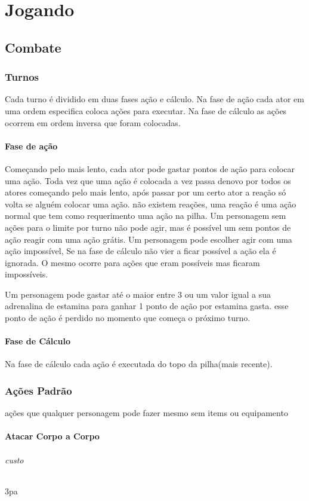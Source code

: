 \part{Jogando}
\chapter{Combate}
\section{Turnos}
%
%
Cada turno é dividido em duas fases ação e cálculo.
Na fase de ação cada ator em uma ordem especifica coloca ações para executar.
Na fase de cálculo as ações ocorrem em ordem inversa que foram colocadas.
%
\subsection{Fase de ação}
Começando pelo mais lento, cada ator pode gastar pontos de ação para colocar uma ação.
Toda vez que uma ação é colocada a vez passa denovo por todos os atores começando pelo mais lento,
após passar por um certo ator a reação só volta se alguém colocar uma ação.
não existem reações, uma reação é uma ação normal que tem como requerimento uma ação na pilha.
Um personagem sem ações para o limite por turno não pode agir, mas é possível um sem pontos de ação reagir com uma ação grátis.
Um personagem pode escolher agir com uma ação impossível,
Se na fase de cálculo não vier a ficar possível a ação ela é ignorada.
O mesmo ocorre para ações que eram possíveis mas ficaram impossíveis.

Um personagem pode gastar até o maior entre 3 ou um valor igual a sua adrenalina de estamina para ganhar 1 ponto de ação por estamina gasta.
esse ponto de ação é perdido no momento que começa o próximo turno.
\subsection{Fase de Cálculo}
Na fase de cálculo cada ação é executada do topo da pilha(mais recente).
%
%
\section{Ações Padrão}
ações que qualquer personagem pode fazer mesmo sem items ou equipamento
%
\subsection{Atacar Corpo a Corpo}
\paragraph{custo} 3pa

